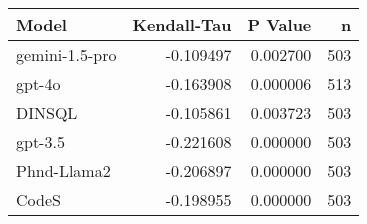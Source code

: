\begin{tabular}{lrrr}
\toprule
Model & Kendall-Tau & P Value & n \\
\midrule
gemini-1.5-pro & -0.109497 & 0.002700 & 503 \\
gpt-4o & -0.163908 & 0.000006 & 513 \\
DINSQL & -0.105861 & 0.003723 & 503 \\
gpt-3.5 & -0.221608 & 0.000000 & 503 \\
Phnd-Llama2 & -0.206897 & 0.000000 & 503 \\
CodeS & -0.198955 & 0.000000 & 503 \\
\bottomrule
\end{tabular}
